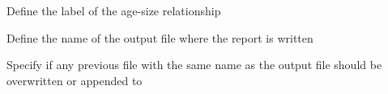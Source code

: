 \subsubsection[Print mean weight at age]{}

 {Define the label of the age-size relationship}

 {Define the name of the output file where the report is written}

 {Specify if any previous file with the same name as the output file should be overwritten or appended to}
